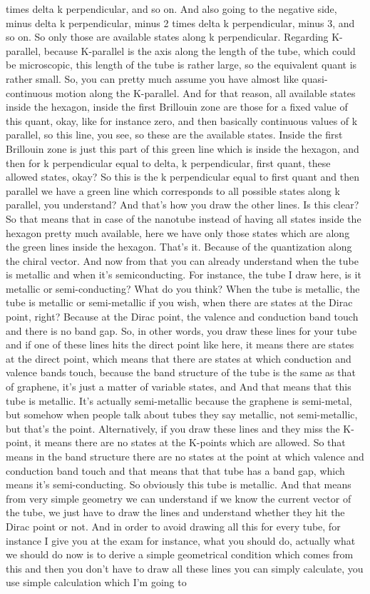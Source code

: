 times delta k perpendicular, and so on. And also going to the negative side, minus delta k perpendicular, minus 2 times delta k perpendicular, minus 3, and so on. So only those are available states along k perpendicular. Regarding K-parallel, because K-parallel is the axis along the length of the tube, which could be microscopic, this length of the tube is rather large, so the equivalent quant is rather small. So, you can pretty much assume you have almost like quasi-continuous motion along the K-parallel. And for that reason, all available states inside the hexagon, inside the first Brillouin zone are those for a fixed value of this quant, okay, like for instance zero, and then basically continuous values of k parallel, so this line, you see, so these are the available states. Inside the first Brillouin zone is just this part of this green line which is inside the hexagon, and then for k perpendicular equal to delta, k perpendicular, first quant, these allowed states, okay? So this is the k perpendicular equal to first quant and then parallel we have a green line which corresponds to all possible states along k parallel, you understand? And that's how you draw the other lines. Is this clear? So that means that in case of the nanotube instead of having all states inside the hexagon pretty much available, here we have only those states which are along the green lines inside the hexagon. That's it. Because of the quantization along the chiral vector. And now from that you can already understand when the tube is metallic and when it's semiconducting. For instance, the tube I draw here, is it metallic or semi-conducting? What do you think? When the tube is metallic, the tube is metallic or semi-metallic if you wish, when there are states at the Dirac point, right? Because at the Dirac point, the valence and conduction band touch and there is no band gap. So, in other words, you draw these lines for your tube and if one of these lines hits the direct point like here, it means there are states at the direct point, which means that there are states at which conduction and valence bands touch, because the band structure of the tube is the same as that of graphene, it's just a matter of variable states, and And that means that this tube is metallic. It's actually semi-metallic because the graphene is semi-metal, but somehow when people talk about tubes they say metallic, not semi-metallic, but that's the point. Alternatively, if you draw these lines and they miss the K-point, it means there are no states at the K-points which are allowed. So that means in the band structure there are no states at the point at which valence and conduction band touch and that means that that tube has a band gap, which means it's semi-conducting. So obviously this tube is metallic. And that means from very simple geometry we can understand if we know the current vector of the tube, we just have to draw the lines and understand whether they hit the Dirac point or not. And in order to avoid drawing all this for every tube, for instance I give you at the exam for instance, what you should do, actually what we should do now is to derive a simple geometrical condition which comes from this and then you don't have to draw all these lines you can simply calculate, you use simple calculation which I'm going to 